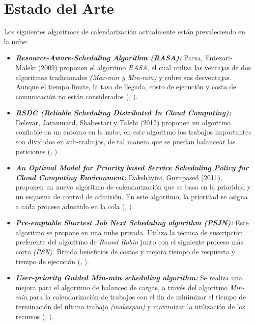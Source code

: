 \documentclass[jou,apacite]{apa6}
\begin{document}
\section{Estado del Arte}

Los siguientes algoritmos de calendarizaci\'on actualmente est\'an prevaleciendo en la nube:
\begin{itemize}
	\item \textit{\textbf{Resource-Aware-Scheduling Algorithm (RASA):}} Parsa, Entezari-Maleki (2009) proponen el algoritmo \textit{RASA}, el cual utiliza las ventajas de dos algoritmos tradicionales \textit{(Max-min y Min-min)} y cubre sus desventajas. Aunque el tiempo l\'imite, la tasa de llegada, costo de ejecución y costo de comunicaci\'on no est\'an considerados (\citeauthor{parsa2009rasa}, \citeyear{parsa2009rasa}).
	
	
	\item \textit{\textbf{RSDC (Reliable Scheduling Distributed In Cloud Computing):}} Delevar, Javanmard, Shabestari y Talebi (2012) proponen un algoritmo confiable en un entorno en la nube, en este algoritmo los trabajos importantes son divididos en sub-trabajos, de tal manera que se puedan balancear las peticiones (\citeauthor{delavar2012rsdc}, \citeyear{delavar2012rsdc}).
	
	
	\item \textit{\textbf{An Optimal Model for Priority based Service Scheduling Policy for Cloud Computing Environment:}} Dakshayini, Gurupased (2011), proponen un nuevo algoritmo de calendarizaci\'on que se basa en la prioridad y un esquema de control de admisi\'on. En este algoritmo, la prioridad se asigna a cada proceso admitido en la cola (\citeauthor{dakshayini2011optimal}, \citeyear{dakshayini2011optimal}) . 
	
	
	\item \textit{\textbf{Pre-emptable Shortest Job Next Scheduling algorithm (PSJN):}}  Este algoritmo se propone en una nube privada. Utiliza la t\'ecnica de suscripci\'on preferente del algoritmo de \textit{Round Robin} junto con el siguiente proceso m\'as corto \textit{(PSN)}. Brinda beneficios de costos y mejora tiempo de respuesta y tiempo de ejecuci\'on (\citeauthor{nishant}, \citeyear{nishant}). 
	
	
	\item \textit{\textbf{User-priority Guided Min-min scheduling algorithm:}} Se realiza una mejora para el algoritmo de balanceo de cargas, a trav\'es del algoritmo \textit{Min-min} para la calendarizaci\'on de trabajos con el fin de minimizar el tiempo de terminaci\'on del \'ultimo trabajo \textit{(makespan)} y maximizar la utilizaci\'on de los recursos (\citeauthor{chen2013user}, \citeyear{chen2013user}). 
\end{itemize}
\end{document}
